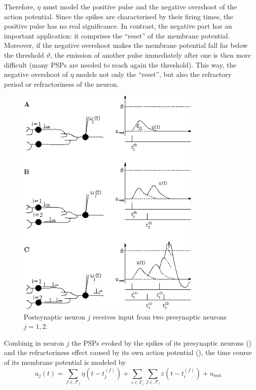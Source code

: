 \begin{description}
{Therefore, $\eta$ must model the positive pulse and the negative overshoot of the action potential. Since the spikes are characterised by their firing times, the positive pulse has no real significance. In contrast, the negative part has an important application: it comprises the ``reset'' of the membrane potential. Moreover, if the negative overshoot makes the membrane potential fall far below the threshold $\vartheta$, the emission of another pulse immediately after one is then more difficult (many PSPs are needed to reach again the threshold). This way, the negative overshoot of $\eta$ models not only the ``reset'', but also the refractory period or refractoriness of the neuron.
}

\end{description}

\begin{figure}[!ht]
\centering
\includegraphics[width=0.8\textwidth]{images/srm_dynamics_png.png}
\caption{Postsynaptic neuron $j$ receives input from two presynaptic neurons $j=1,2$.}
\label{fig:srmdynamic}
\end{figure} 

Combinig in neuron $j$ the PSPs evoked by the spikes of its presynaptic neurons () and the refractoriness effect caused by its own action potential (), the time course of its membrane potential is modeled by
\begin{equation}
u_{j}(t)=\sum_{f\in \mathcal{F}_{j}}\eta(t-t_{j}^{(f)})+
\sum_{i\in \Gamma_{j}}\sum_{f\in \mathcal{F}_{i}}
	\varepsilon(t-t_{i}^{(f)})+u_{\text{rest}}
\label{eq:srmuniqueconnection}
\end{equation}

